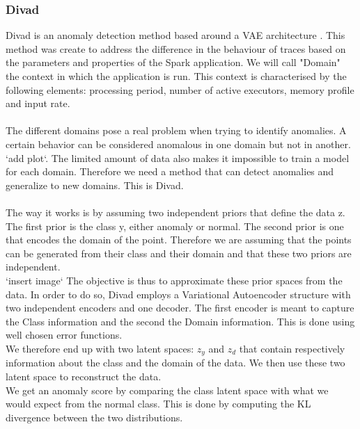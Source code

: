 \documentclass[oneside, a4paper, onecolumn, 11pt]{article}
\begin{document}
\subsubsection{Divad}
\label{subsec:divad_domain}

Divad is an anomaly detection method based around a VAE architecture \cite{Divad}. This method was create to address the difference in the behaviour of traces based on the parameters and properties of the Spark application. We will call "Domain" the context in which the application is run. This context is characterised by the following elements: processing period, number of active executors, memory profile and input rate.\\\\
The different domains pose a real problem when trying to identify anomalies. A certain behavior can be considered anomalous in one domain but not in another. `add plot`.
The limited amount of data also makes it impossible to train a model for each domain. Therefore we need a method that can detect anomalies and generalize to new domains. This is Divad.\\\\
The way it works is by assuming two independent priors that define the data z. The first prior is the class y, either anomaly or normal. The second prior is one that encodes the domain of the point. Therefore we are assuming that the points can be generated from their class and their domain and that these two priors are independent.\\
`insert image`
The objective is thus to approximate these prior spaces from the data. In order to do so, Divad employs a Variational Autoencoder structure with two independent encoders and one decoder. The first encoder is meant to capture the Class information and the second the Domain information. This is done using well chosen error functions.\\
We therefore end up with two latent spaces: $z_y$ and $z_d$ that contain respectively information about the class and the domain of the data. We then use these two latent space to reconstruct the data.\\
We get an anomaly score by comparing the class latent space with what we would expect from the normal class. This is done by computing the KL divergence between the two distributions.\\
\end{document}
